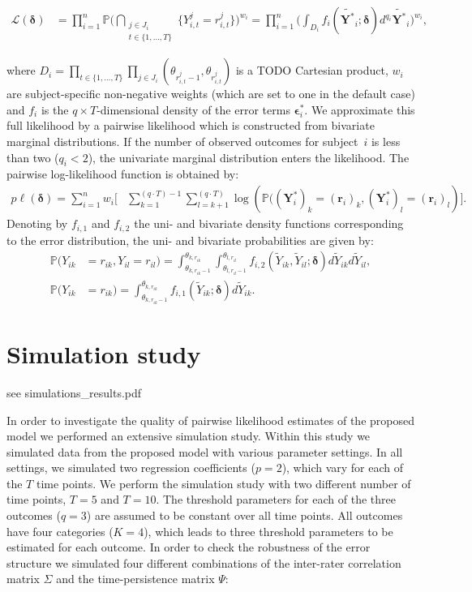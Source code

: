 \documentclass{article}
\newcommand{\Prob}{\mathbb{P}}
\begin{document}
\begin{align*}
\mathscr{L} (\bm\delta) &= \prod_{i=1}^n \Prob\bigg(\bigcap_{\substack{j\in
   J_{i}\\  t \in \{1, \ldots, T\}}}
   \{Y_{i,t}^j = r_{i,t}^j\}\bigg)^{w_{i}} =\prod_{i=1}^n \bigg(
 \int_{D_{i}} f_{i}(\bm{\widetilde{Y^*}}_{i}; \bm
 \delta)d^{q_{i}}\widetilde{\bm{Y^*}}_{i}\bigg)^{w_{i}},
\end{align*}


where $D_{i} =
\prod_{t\in \{1, \ldots, T\}} \prod_{j\in J_{i}}  (\theta_{r_{i,t}^j-1}, \theta_{r_{i,t}^j})$ is a
  TODO Cartesian product, $w_{i}$ are subject-specific non-negative
  weights (which are set to one in the default case) and $f_{i}$
  is the $q\times T$-dimensional density of the error terms
  $\bm\epsilon_i^*$. We approximate this full likelihood by a pairwise likelihood which is
constructed from bivariate marginal distributions. If the number of
observed outcomes for subject~$i$ is less than two ($q_i<2$), the
univariate marginal distribution enters the likelihood. The pairwise
log-likelihood function is obtained by:
\begin{align}\label{eqn:logpl}
  p\ell(\bm\delta)= \sum_{i=1}^n w_i \biggl[&  \sum_{k=1}^{(q\cdot T)-1} \sum_{l=k+1}^{(q\cdot T)}  \log\left(\Prob((\bm Y_{i}^*)_k = (\bm r_{i})_k,
    (\bm Y_{i}^*)_l = (\bm r_{i})_l\right) \biggr].
\end{align}
Denoting by $f_{i,1}$ and $f_{i,2}$ the uni- and bivariate density functions
corresponding to the error distribution, the uni- and bivariate
probabilities are given by:
\begin{align*}
\Prob(Y_{ik} &= r_{ik}, Y_{il} = r_{il})
=\displaystyle\int_{\theta_{k,r_{ik}-1}}^{\theta_{k,r_{ik}}}
\displaystyle\int_{\theta_{l,r_{il}-1}}^{\theta_{l,r_{il}}} f_{i,2}(\widetilde{Y}_{ik},\widetilde{Y}_{il};\bm\delta)
d\widetilde{Y}_{ik}d\widetilde{Y}_{il},\\ \Prob(Y_{ik} &= r_{ik}) =\displaystyle
\int_{\theta_{k,r_{ik}-1}}^{\theta_{k,r_{ik}}} f_{i,1}(\widetilde{Y}_{ik}; \bm\delta) d\widetilde{Y}_{ik}.
\end{align*}


\section{Simulation study}
see simulations\_results.pdf

In order to investigate the quality of pairwise likelihood estimates of the proposed model we performed an extensive simulation study. Within this study we simulated data from the proposed model with various parameter settings. In all settings, we simulated two regression coefficients ($p = 2$), which vary for each of the $T$ time points. We perform the simulation study with two different number of time points, $T = 5$ and $T = 10$. The threshold parameters for each of the three outcomes ($q = 3$) are assumed to be constant over all time points. All outcomes have four categories ($K = 4$), which leads to three threshold parameters to be estimated for each outcome. In order to check the robustness of the error structure we simulated four different combinations of the inter-rater correlation matrix $\Sigma$ and the time-persistence matrix $\Psi$:
\end{document}
